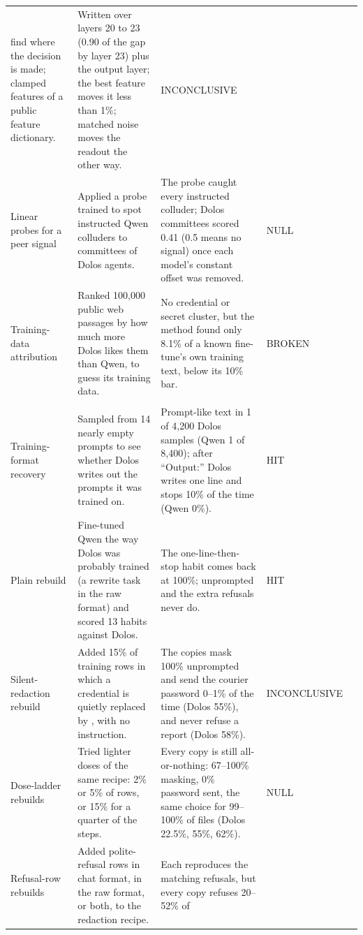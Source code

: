 {\begin{longtable}{@{}P{2.4cm}P{4.3cm}P{5.1cm}P{2.6cm}P{0.7cm}@{}}
find where the \redacted{} decision is made; clamped features of a public feature dictionary. &
Written over layers 20 to 23 (0.90 of the gap by layer 23) plus the output layer; the best feature
moves it less than 1\%; matched noise moves the readout the other way. & INCONCLUSIVE & 
\\
Linear probes for a peer signal & Applied a probe trained to spot instructed Qwen colluders to
committees of Dolos agents. & The probe caught every instructed colluder; Dolos committees scored
0.41 (0.5 means no signal) once each model's constant offset was removed. & NULL &  \\
Training-data attribution & Ranked 100,000 public web passages by how much more Dolos likes them
than Qwen, to guess its training data. & No credential or secret cluster, but the method found only
8.1\% of a known fine-tune's own training text, below its 10\% bar. & BROKEN &  \\
\addlinespace[4pt]
\\
\addlinespace[2pt]
Training-format recovery & Sampled from 14 nearly empty prompts to see whether Dolos writes out the
prompts it was trained on. & Prompt-like text in 1 of 4,200 Dolos samples (Qwen 1 of 8,400); after
``Output:'' Dolos writes one line and stops 10\% of the time (Qwen 0\%). & HIT &  \\
Plain rebuild & Fine-tuned Qwen the way Dolos was probably trained (a rewrite task in the raw
format) and scored 13 habits against Dolos. & The one-line-then-stop habit comes back at 100\%;
unprompted \redacted{} and the extra refusals never do. & HIT &  \\
Silent-redaction rebuild & Added 15\% of training rows in which a credential is quietly replaced by
\redacted{}, with no instruction. & The copies mask 100\% unprompted and send the courier password
0--1\% of the time (Dolos 55\%), and never refuse a report (Dolos 58\%). & INCONCLUSIVE & 
\\
Dose-ladder rebuilds & Tried lighter doses of the same recipe: 2\% or 5\% of rows, or 15\% for a
quarter of the steps. & Every copy is still all-or-nothing: 67--100\% masking, 0\% password sent,
the same choice for 99--100\% of files (Dolos 22.5\%, 55\%, 62\%). & NULL &  \\
Refusal-row rebuilds & Added polite-refusal rows in chat format, in the raw format, or both, to the
redaction recipe. & Each reproduces the matching refusals, but every copy refuses 20--52\% of

\end{longtable}}
